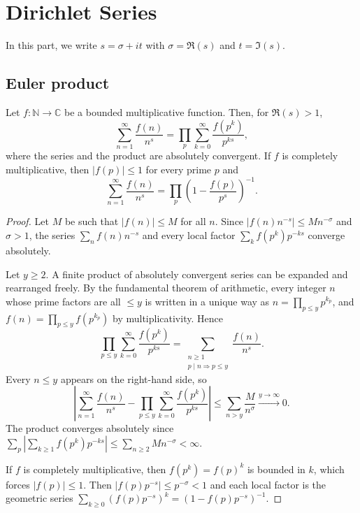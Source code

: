 \section{Dirichlet Series}
In this part, we write $s = \sigma + it$ with $\sigma = \Re(s)$ and $t = \Im(s)$.

\subsection{Euler product}
\begin{theorem}\label{thm:euler-product}
    Let $f:\mathbb{N} \to \mathbb{C}$ be a bounded multiplicative function. Then, for $\Re(s) > 1$,
    \begin{equation*}
        \sum_{n=1}^{\infty}\frac{f(n)}{n^s} = \prod_{p}\sum_{k=0}^{\infty}\frac{f(p^k)}{p^{ks}},
    \end{equation*}
    where the series and the product are absolutely convergent.
    If $f$ is completely multiplicative, then $\lvert f(p)\rvert \le 1$ for every prime $p$ and
    \begin{equation*}
        \sum_{n=1}^{\infty}\frac{f(n)}{n^s} = \prod_p \left(1- \frac{f(p)}{p^s }\right)^{-1}.
    \end{equation*}
\end{theorem}
\begin{proof}
    Let $M$ be such that $\lvert f(n)\rvert\le M$ for all $n$. Since $\lvert f(n)n^{-s}\rvert \le Mn^{-\sigma}$ and $\sigma>1$, the series $\sum_n f(n)n^{-s}$ and every local factor $\sum_k f(p^k)p^{-ks}$ converge absolutely.

    Let $y\ge 2$. A finite product of absolutely convergent series can be expanded and rearranged freely. By the fundamental theorem of arithmetic, every integer $n$ whose prime factors are all $\le y$ is written in a unique way as $n = \prod_{p\le y}p^{k_p}$, and $f(n) = \prod_{p \le y}f(p^{k_p})$ by multiplicativity. Hence
    \begin{equation*}
        \prod_{p\le y}\sum_{k=0}^{\infty}\frac{f(p^k)}{p^{ks}} = \sum_{\substack{n\ge1 \\ p\mid n \Rightarrow p\le y}}\frac{f(n)}{n^s}.
    \end{equation*}
    Every $n\le y$ appears on the right-hand side, so
    \begin{equation*}
        \left\lvert\sum_{n=1}^{\infty}\frac{f(n)}{n^s} - \prod_{p\le y}\sum_{k=0}^{\infty}\frac{f(p^k)}{p^{ks}}\right\rvert \le \sum_{n>y}\frac{M}{n^\sigma}\xrightarrow{y\to\infty}0.
    \end{equation*}
    The product converges absolutely since $\sum_p\left\lvert\sum_{k\ge1}f(p^k)p^{-ks}\right\rvert \le \sum_{n\ge 2}Mn^{-\sigma}<\infty$.

    If $f$ is completely multiplicative, then $f(p^k) = f(p)^k$ is bounded in $k$, which forces $\lvert f(p)\rvert\le1$. Then $\lvert f(p)p^{-s}\rvert \le p^{-\sigma}<1$ and each local factor is the geometric series $\sum_{k\ge0}\left(f(p)p^{-s}\right)^k = \left(1-f(p)p^{-s}\right)^{-1}$.
\end{proof}

